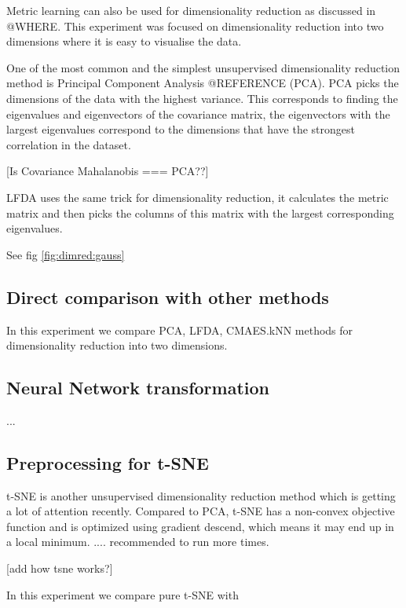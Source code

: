 \documentclass[12pt,a4paper]{report}
\begin{document}
Metric learning can also be used for dimensionality reduction as discussed in @WHERE. This experiment was focused on dimensionality reduction into two dimensions where it is easy to visualise the data.

One of the most common and the simplest unsupervised dimensionality reduction method is Principal Component Analysis @REFERENCE (PCA). PCA picks the dimensions of the data with the highest variance. This corresponds to finding the eigenvalues and eigenvectors of the covariance matrix, the eigenvectors with the largest eigenvalues correspond to the dimensions that have the strongest correlation in the dataset.

[Is Covariance Mahalanobis === PCA??]

LFDA uses the same trick for dimensionality reduction, it calculates the metric matrix and then picks the columns of this matrix with the largest corresponding eigenvalues.


See fig \ref{fig:dimred:gauss}

\subsection{Direct comparison with other methods}

In this experiment we compare PCA, LFDA, CMAES.kNN methods for dimensionality reduction into two dimensions.


\subsection{Neural Network transformation}

...

\subsection{Preprocessing for t-SNE}

t-SNE \cite{maaten2008visualizing} is another unsupervised dimensionality reduction method which is getting a lot of attention recently. Compared to PCA, t-SNE has a non-convex objective function and is optimized using gradient descend, which means it may end up in a local minimum. .... recommended to run more times.

[add how tsne works?]

In this experiment we compare pure t-SNE with
\end{document}
